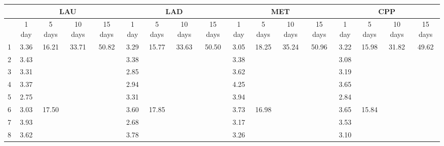 \begin{center}
\begin{tabular}{| l || c | c | c | c | c | c | c | c | c | c | c | c | c | c | c | c |}\hline
 & \multicolumn{4}{c|}{LAU} & \multicolumn{4}{c|}{LAD} & \multicolumn{4}{c|}{MET} & \multicolumn{4}{c|}{CPP} \\\hline
 & 1 day & 5 days & 10 days & 15 days & 1 day & 5 days & 10 days & 15 days & 1 day & 5 days & 10 days & 15 days & 1 day & 5 days & 10 days & 15 days \\\hline
1 & \multirow{1}{*}{ 3.36 }  & \multirow{5}{*}{ 16.21 }  & \multirow{10}{*}{ 33.71 }  & \multirow{15}{*}{ 50.82 }  & \multirow{1}{*}{ 3.29 }  & \multirow{5}{*}{ 15.77 }  & \multirow{10}{*}{ 33.63 }  & \multirow{15}{*}{ 50.50 }  & \multirow{1}{*}{ 3.05 }  & \multirow{5}{*}{ 18.25 }  & \multirow{10}{*}{ 35.24 }  & \multirow{15}{*}{ 50.96 }  & \multirow{1}{*}{ 3.22 }  & \multirow{5}{*}{ 15.98 }  & \multirow{10}{*}{ 31.82 }  & \multirow{15}{*}{ 49.62 }  \\\cline{2-2}\cline{6-6}\cline{10-10}\cline{14-14}
2 & \multirow{1}{*}{ 3.43 }  & & & & \multirow{1}{*}{ 3.38 }  & & & & \multirow{1}{*}{ 3.38 }  & & & & \multirow{1}{*}{ 3.08 }  & & & \\\cline{2-2}\cline{6-6}\cline{10-10}\cline{14-14}
3 & \multirow{1}{*}{ 3.31 }  & & & & \multirow{1}{*}{ 2.85 }  & & & & \multirow{1}{*}{ 3.62 }  & & & & \multirow{1}{*}{ 3.19 }  & & & \\\cline{2-2}\cline{6-6}\cline{10-10}\cline{14-14}
4 & \multirow{1}{*}{ 3.37 }  & & & & \multirow{1}{*}{ 2.94 }  & & & & \multirow{1}{*}{ 4.25 }  & & & & \multirow{1}{*}{ 3.65 }  & & & \\\cline{2-2}\cline{6-6}\cline{10-10}\cline{14-14}
5 & \multirow{1}{*}{ 2.75 }  & & & & \multirow{1}{*}{ 3.31 }  & & & & \multirow{1}{*}{ 3.94 }  & & & & \multirow{1}{*}{ 2.84 }  & & & \\\cline{2-2}\cline{6-6}\cline{10-10}\cline{14-14}\cline{3-3}\cline{7-7}\cline{11-11}\cline{15-15}
6 & \multirow{1}{*}{ 3.03 }  & \multirow{5}{*}{ 17.50 }  & & & \multirow{1}{*}{ 3.60 }  & \multirow{5}{*}{ 17.85 }  & & & \multirow{1}{*}{ 3.73 }  & \multirow{5}{*}{ 16.98 }  & & & \multirow{1}{*}{ 3.65 }  & \multirow{5}{*}{ 15.84 }  & & \\\cline{2-2}\cline{6-6}\cline{10-10}\cline{14-14}
7 & \multirow{1}{*}{ 3.93 }  & & & & \multirow{1}{*}{ 2.68 }  & & & & \multirow{1}{*}{ 3.17 }  & & & & \multirow{1}{*}{ 3.53 }  & & & \\\cline{2-2}\cline{6-6}\cline{10-10}\cline{14-14}
8 & \multirow{1}{*}{ 3.62 }  & & & & \multirow{1}{*}{ 3.78 }  & & & & \multirow{1}{*}{ 3.26 }  & & & & \multirow{1}{*}{ 3.10 }  & & & \\\cline{2-2}\cline{6-6}\cline{10-10}\cline{14-14}

\end{tabular}
\end{center}
